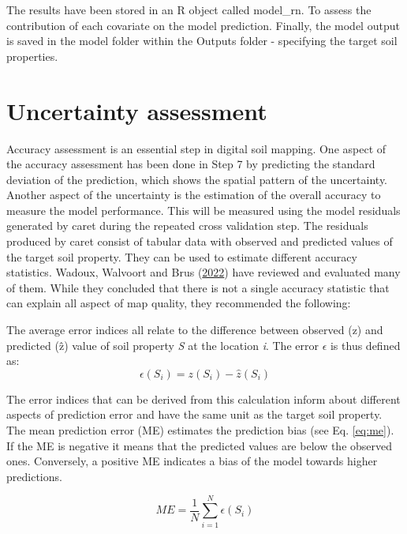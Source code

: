 \documentclass[
  10pt,
  b5paper,
  oneside]{book}
\begin{document}
The results have been stored in an R object called model\_rn. To assess the contribution of each covariate on the model prediction. Finally, the model output is saved in the model folder within the Outputs folder - specifying the target soil properties.

\hypertarget{uncertainty-assessment}{%
\section{Uncertainty assessment}\label{uncertainty-assessment}}

Accuracy assessment is an essential step in digital soil mapping. One aspect of the accuracy assessment has been done in Step 7 by predicting the standard deviation of the prediction, which shows the spatial pattern of the uncertainty. Another aspect of the uncertainty is the estimation of the overall accuracy to measure the model performance. This will be measured using the model residuals generated by caret during the repeated cross validation step.
The residuals produced by caret consist of tabular data with observed and predicted values of the target soil property. They can be used to estimate different accuracy statistics. Wadoux, Walvoort and Brus (\protect\hyperlink{ref-Wadoux2022}{2022}) have reviewed and evaluated many of them. While they concluded that there is not a single accuracy statistic that can explain all aspect of map quality, they recommended the following:

The average error indices all relate to the difference between observed (z) and predicted (ẑ) value of soil property \emph{S} at the location \emph{i}. The error \(\epsilon\) is thus defined as:
\begin{equation}
\epsilon(S_{i}) = z(S_{i}) - \hat{z}(S_{i})
\end{equation}

The error indices that can be derived from this calculation inform about different aspects of prediction error and have the same unit as the target soil property. The mean prediction error (ME) estimates the prediction bias (see Eq. \eqref{eq:me}). If the ME is negative it means that the predicted values are below the observed ones. Conversely, a positive ME indicates a bias of the model towards higher predictions.

\begin{equation} 
  ME = \frac{1}{N}\sum_{i=1}^{N}\epsilon(S_{i})
  \label{eq:me}
\end{equation}
\end{document}
